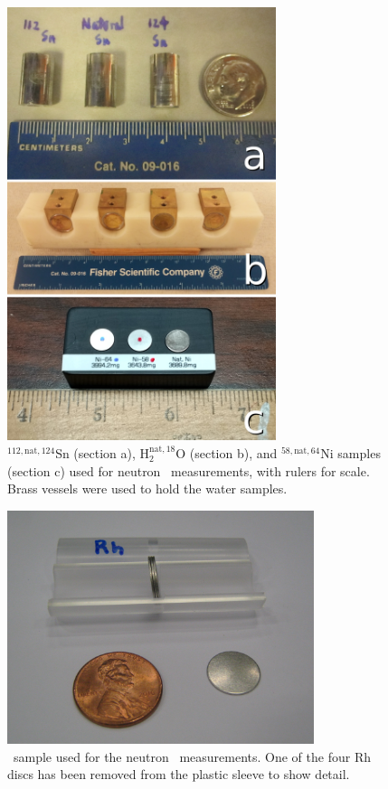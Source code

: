 \begin{figure}[tb]
    \centering
    \includegraphics[width=0.7\textwidth]{figures/AllIsotopicSamples.jpg}
    \caption[${^{112,\text{nat},124}}$Sn, $^{{\text{nat}, 18}}$O, and ${^{58,\text{nat},64}}$Ni
    samples used for neutron \tot\ measurements]
    {
        ${^{112,\text{nat},124}}$Sn (section a), H$_2^{{\text{nat}, 18}}$O (section
        b), and ${^{58,\text{nat},64}}$Ni
        samples (section c) used for neutron \tot\ measurements, with rulers for
        scale. Brass vessels were used to hold the water samples.
    }
    \label{SamplesImage}
\end{figure}

\begin{figure}[tb]
    \centering
    \includegraphics[width=0.8\textwidth]{figures/RhodiumSample.jpg}
    \caption{\rhThree\ sample used for the neutron \tot\ measurements. One of
    the four Rh discs has been removed from the plastic sleeve to show detail.}
    \label{RhodiumSample}
\end{figure}

